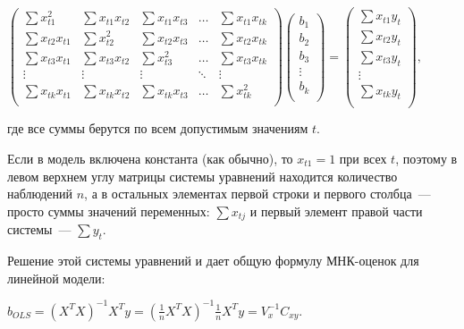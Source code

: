 \documentclass[a4paper]{article}
\begin{document}
{{{{{{{{\begin{center}
 {{\(\begin{pmatrix}
    {\sum x_{t1}^{2}} & {\sum x_{t1}x_{t2}} & {\sum x_{t1}x_{t3}} & \ldots & {\sum x_{t1}x_{tk}} \\
    {\sum x_{t2}x_{t1}} & {\sum x_{t2}^{2}} & {\sum x_{t2}x_{t3}} & \ldots & {\sum x_{t2}x_{tk}} \\
    {\sum x_{t3}x_{t1}} & {\sum x_{t3}x_{t2}} & {\sum x_{t3}^{2}} & \ldots & {\sum x_{t3}x_{tk}} \\
    \vdots & \vdots & \vdots & \ddots & \vdots \\
    {\sum x_{tk}x_{t1}} & {\sum x_{tk}x_{t2}} & {\sum x_{tk}x_{t3}} & \ldots & {\sum x_{tk}^{2}} \\
    \end{pmatrix}\begin{pmatrix}
    b_{1} \\
    b_{2} \\
    b_{3} \\
    \vdots \\
    b_{k} \\
    \end{pmatrix} = \begin{pmatrix}
    {\sum x_{t1}y_{t}} \\
    {\sum x_{t2}y_{t}} \\
    {\sum x_{t3}y_{t}} \\
    \vdots \\
    {\sum x_{tk}y_{t}} \\
    \end{pmatrix},\)}}
\end{center}

где все суммы берутся по всем допустимым значениям
{{\(t\)}}.

Если в модель включена константа (как обычно), то {{\(x_{t1} = 1\)}} при
всех {{\(t\)}}, поэтому в левом верхнем углу матрицы системы уравнений
находится количество наблюдений {{\(n\)}}, а в остальных элементах
первой строки и первого столбца~--- просто суммы значений переменных:
{{\(\sum x_{tj}\)}} и первый элемент правой части системы~---
{{\(\sum y_{t}\)}}.

Решение этой системы уравнений и дает общую формулу МНК-оценок для
линейной модели:

\begin{center}
 {{\({\hat{b}}_{OLS} = (X^{T}X)^{- 1}X^{T}y = \left( {\frac{1}{n}X^{T}X} \right)^{- 1}\frac{1}{n}X^{T}y = V_{x}^{- 1}C_{xy}\)}}.
\end{center}

}}}}}}}}
\end{document}
